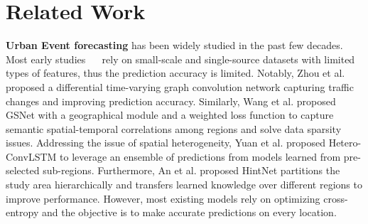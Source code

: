 \documentclass{article}
\begin{document}
{\section{Related Work}
\textbf{Urban Event forecasting} has been widely studied in the past few decades. %
Most early studies \cite{Chong2004TrafficAA}~\cite{Lin2015}~\cite{barba2014smoothing}\cite{KhezerlouAminVahedian2021DPUD} rely on small-scale and single-source datasets with limited types of features, thus the prediction accuracy is limited. %
Notably, Zhou et al. \cite{9242313} proposed a differential time-varying graph convolution network capturing traffic changes and improving prediction accuracy. Similarly, Wang et al. \cite{Wang2021gsnet} proposed GSNet with a geographical module and a weighted loss function to capture semantic spatial-temporal correlations among regions and solve data sparsity issues. %
Addressing the issue of spatial heterogeneity, Yuan et al. \cite{yuan2018hetero} proposed Hetero-ConvLSTM to leverage an ensemble of predictions from models learned from pre-selected sub-regions. Furthermore, An et al. \cite{doi:10.1137/1.9781611977172.38} proposed HintNet partitions the study area hierarchically and transfers learned knowledge over different regions to improve performance. However, most existing models rely on optimizing cross-entropy and the objective is to make accurate predictions on every location. %
}
\end{document}
